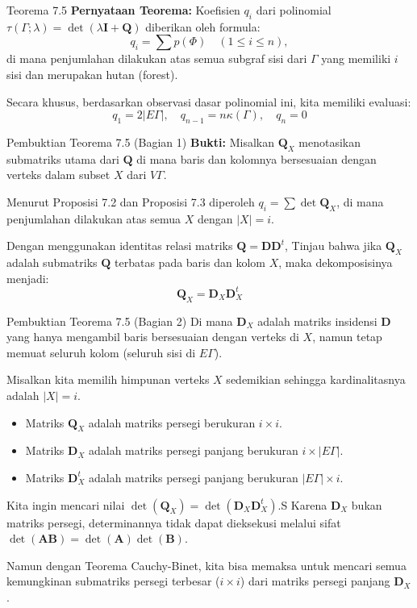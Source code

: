 \documentclass[aspectratio=169]{beamer}
\begin{document}
\begin{frame}{Teorema 7.5}
  \textbf{Pernyataan Teorema:}
  Koefisien $q_i$ dari polinomial $\tau(\Gamma; \lambda) = \det(\lambda \mathbf{I} + \mathbf{Q})$ diberikan oleh formula:
  $$ q_i = \sum p(\Phi) \quad (1 \leqslant i \leqslant n), $$
  di mana penjumlahan dilakukan atas semua subgraf sisi dari $\Gamma$ yang memiliki $i$ sisi dan merupakan hutan (forest).

  \vspace{0.5cm}
  Secara khusus, berdasarkan observasi dasar polinomial ini, kita memiliki evaluasi:
  $$ q_1 = 2|E\Gamma|, \quad q_{n-1} = n\kappa(\Gamma), \quad q_n = 0 $$
\end{frame}

\begin{frame}{Pembuktian Teorema 7.5 (Bagian 1)}
  \textbf{Bukti:}
  Misalkan $\mathbf{Q}_X$ menotasikan submatriks utama dari $\mathbf{Q}$ di mana baris dan kolomnya bersesuaian dengan verteks dalam subset $X$ dari $V\Gamma$.

  Menurut Proposisi 7.2 dan Proposisi 7.3 diperoleh $q_i = \sum \det \mathbf{Q}_X$, di mana penjumlahan dilakukan atas semua $X$ dengan $|X| = i$.

  Dengan menggunakan identitas relasi matriks $\mathbf{Q} = \mathbf{D}\mathbf{D}^t$, Tinjau bahwa jika $\mathbf{Q}_X$ adalah submatriks $\mathbf{Q}$ terbatas pada baris dan kolom $X$, maka dekomposisinya menjadi:
  $$ \mathbf{Q}_X = \mathbf{D}_X \mathbf{D}_X^t $$
\end{frame}

\begin{frame}{Pembuktian Teorema 7.5 (Bagian 2)}
  Di mana $\mathbf{D}_X$ adalah matriks insidensi $\mathbf{D}$ yang hanya mengambil baris bersesuaian dengan verteks di $X$, namun tetap memuat seluruh kolom (seluruh sisi di $E\Gamma$).

  Misalkan kita memilih himpunan verteks $X$ sedemikian sehingga kardinalitasnya adalah $|X| = i$.

  \begin{itemize}
    \item Matriks $\mathbf{Q}_X$ adalah matriks persegi berukuran $i \times i$.
    \item Matriks $\mathbf{D}_X$ adalah matriks persegi panjang berukuran $i \times |E\Gamma|$.
    \item Matriks $\mathbf{D}_X^t$ adalah matriks persegi panjang berukuran $|E\Gamma| \times i$.
  \end{itemize}

  Kita ingin mencari nilai $\det(\mathbf{Q}_X) = \det(\mathbf{D}_X \mathbf{D}_X^t)$.S
  Karena $\mathbf{D}_X$ bukan matriks persegi, determinannya tidak dapat dieksekusi melalui sifat $\det(\mathbf{A}\mathbf{B}) = \det(\mathbf{A})\det(\mathbf{B})$.

  Namun dengan Teorema Cauchy-Binet, kita bisa memaksa untuk mencari semua kemungkinan submatriks persegi terbesar ($i \times i$) dari matriks persegi panjang $\mathbf{D}_X$.
\end{frame}
\end{document}
